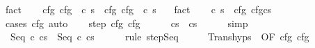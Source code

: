 \begin{isabellebody}
\ fact\isanewline
\ \ \isamarkupfalse%
\ cfg\ {\isachardoublequoteopen}cfg\ {\isacharequal}\ {\isacharparenleft}c\ s{\isacharparenright}{\isachardoublequoteclose}\ \ cfg\ {\isachardoublequoteopen}cfg\ {\isacharequal}\ {\isacharparenleft}c\ s{\isacharprime}{\isacharparenright}{\isachardoublequoteclose}\ \ \isamarkupfalse%
\ fact{\isacharplus}\isanewline
\ \ \isamarkupfalse%
\ c\ s{\isacharprime}{\isacharprime}\ \ cfg{\isacharprime}{\isacharprime}{\isacharcolon}\ {\isachardoublequoteopen}cfg{\isacharprime}{\isacharprime}{\isacharequal}{\isacharparenleft}cs{\isacharprime}{\isacharprime}{\isacharparenright}{\isachardoublequoteclose}\isanewline
\ \ \ \ \isamarkupfalse%
\ {\isacharparenleft}cases\ cfg{\isacharprime}{\isacharprime}{\isacharparenright}\ auto\isanewline
\ \ \isamarkupfalse%
\ step\ cfg\ cfg{\isacharprime}{\isacharprime}\ \isanewline
\ \ \isamarkupfalse%
\ {\isachardoublequoteopen}{\isasymGamma}{\isasymturnstile}\ {\isacharparenleft}cs{\isacharparenright}\ {\isasymrightarrow}\ {\isacharparenleft}cs{\isacharprime}{\isacharprime}{\isacharparenright}{\isachardoublequoteclose}\isanewline
\ \ \ \ \isamarkupfalse%
\ simp\isanewline
\ \ \isamarkupfalse%
\ {\isachardoublequoteopen}{\isasymGamma}{\isasymturnstile}\ {\isacharparenleft}Seq\ c\ cs{\isacharparenright}\ {\isasymrightarrow}\ {\isacharparenleft}Seq\ c\ cs{\isacharprime}{\isacharprime}{\isacharparenright}{\isachardoublequoteclose}\isanewline
\ \ \ \ \isamarkupfalse%
\ {\isacharparenleft}rule\ step{\isachardot}Seq{\isacharparenright}\isanewline
\ \ \isamarkupfalse%
\ \isamarkupfalse%
\ Trans{\isachardot}hyps\ {\isacharparenleft}{}{\isacharparenright}\ {\isacharbrackleft}OF\ cfg{\isacharprime}{\isacharprime}\ cfg\isanewline

\end{isabellebody}
